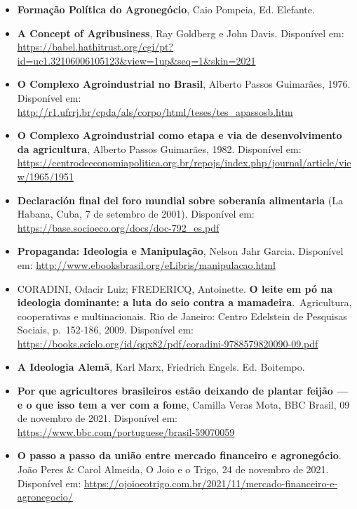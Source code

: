 \documentclass[12pt]{article}
\numberwithin{equation}{section}
\theoremstyle{plain}
\theoremstyle{definition}
\theoremstyle{remark}
\begin{document}
\begin{itemize}
\tightlist
\item
  \textbf{Formação Política do Agronegócio}, Caio Pompeia, Ed. Elefante.
\item
  \textbf{A Concept of Agribusiness}, Ray Goldberg e John Davis. Disponível em: \url{https://babel.hathitrust.org/cgi/pt?id=uc1.32106006105123\&view=1up\&seq=1\&skin=2021}
\item
  \textbf{O Complexo Agroindustrial no Brasil}, Alberto Passos Guimarães, 1976. Disponível em: \url{http://r1.ufrrj.br/cpda/als/corpo/html/teses/tes_apassosb.htm}
\item
  \textbf{O Complexo Agroindustrial como etapa e via de desenvolvimento da agricultura}, Alberto Passos Guimarães, 1982. Disponível em: \url{https://centrodeeconomiapolitica.org.br/repojs/index.php/journal/article/view/1965/1951}
\item
  \textbf{Declaración final del foro mundial sobre soberanía alimentaria} (La Habana, Cuba, 7 de setembro de 2001). Disponível em: \url{https://base.socioeco.org/docs/doc-792_es.pdf}
\item
  \textbf{Propaganda: Ideologia e Manipulação}, Nelson Jahr Garcia. Disponível em: \url{http://www.ebooksbrasil.org/eLibris/manipulacao.html}
\item
  CORADINI, Odacir Luiz; FREDERICQ, Antoinette. \textbf{O leite em pó na ideologia dominante: a luta do seio contra a mamadeira}.~Agricultura, cooperativas e multinacionais. Rio de Janeiro: Centro Edelstein de Pesquisas Sociais, p.~152-186, 2009. Disponível em: \url{https://books.scielo.org/id/qqx82/pdf/coradini-9788579820090-09.pdf}
\item
  \textbf{A Ideologia Alemã}, Karl Marx, Friedrich Engels. Ed. Boitempo.
\item
  \textbf{Por que agricultores brasileiros estão deixando de plantar feijão --- e o que isso tem a ver com a fome}, Camilla Veras Mota, BBC Brasil, 09 de novembro de 2021. Disponível em: \url{https://www.bbc.com/portuguese/brasil-59070059}
\item
  \textbf{O passo a passo da união entre mercado financeiro e agronegócio}. João Peres \& Carol Almeida, O Joio e o Trigo, 24 de novembro de 2021. Disponível em: \url{https://ojoioeotrigo.com.br/2021/11/mercado-financeiro-e-agronegocio/}
\end{itemize}

\printbibliography
\end{document}
